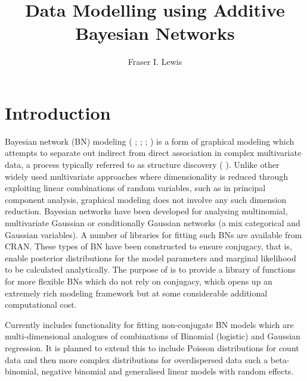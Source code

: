 \documentclass[nojss]{jss}
\author{Fraser I. Lewis}
\title{Data Modelling using Additive Bayesian Networks}
\begin{document}

\section{Introduction}
Bayesian network (BN) modeling (\citeauthor{Buntine1991} \citeyear{Buntine1991}; \citeauthor{HECKERMAN1995} \citeyear{HECKERMAN1995};  \citeauthor{Lauritzen1996} \citeyear{Lauritzen1996}; \citeauthor{Jensen2001} \citeyear{Jensen2001}) is a form of graphical modeling which attempts to separate out indirect from direct association in complex multivariate data, a process typically referred to as structure discovery (\citeauthor{Friedman2003} \citeyear{Friedman2003}). Unlike other widely used multivariate approaches where dimensionality is reduced through exploiting linear combinations of random variables, such as in principal component analysis, graphical modeling does not involve any such dimension reduction. Bayesian networks have been developed for analysing multinomial, multivariate Gaussian or conditionally Gaussian networks (a mix categorical and Gaussian variables). A number of libraries for fitting such BNs are available from CRAN. These types of BN have been constructed to ensure conjugacy, that is, enable posterior distributions for the model parameters and marginal likelihood to be calculated analytically. The purpose of  is to provide a library of functions for more flexible BNs which do not rely on conjugacy, which opens up an extremely rich modeling framework but at some considerable additional computational cost. 

Currently  includes functionality for fitting non-conjugate BN models which are multi-dimensional analogues of combinations of Binomial (logistic) and Gaussian regression. It is planned to extend this to include Poisson distributions for count data and then more complex distributions for overdispersed data such a beta-binomial, negative binomial and generalised linear models with random effects.   
\end{document}

